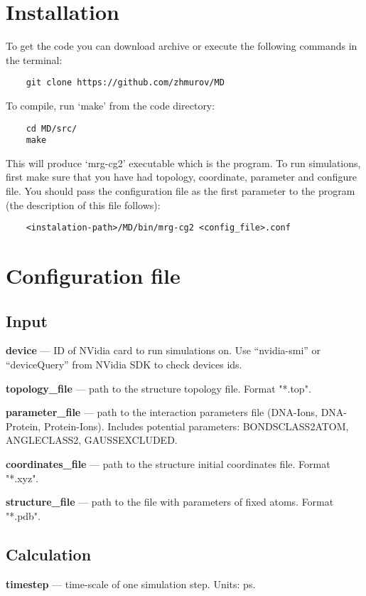 \documentclass[12pt,a4paper]{article}
\begin{document}
\section{Installation}
\label{sec:inst}
\noindent
To get the code you can download archive or execute the following commands in the terminal:
\begin{verbatim}
    git clone https://github.com/zhmurov/MD
\end{verbatim}
To compile, run `make' from the code directory:
\begin{verbatim}
    cd MD/src/
    make
\end{verbatim}
This will produce `mrg-cg2' executable which is the program. To run simulations, first make sure that you have had topology, coordinate, parameter and configure file. You should pass the configuration file as the first parameter to the program (the description of this file follows):
\begin{verbatim}
    <instalation-path>/MD/bin/mrg-cg2 <config_file>.conf
\end{verbatim}

\section{Configuration file}

\subsection{Input}

{\bf device} ---  ID of NVidia card to run simulations on. Use “nvidia-smi” or “deviceQuery” from NVidia SDK to check devices ids.

{\bf topology\_file} --- path to the structure topology file. Format "*.top".

{\bf parameter\_file} --- path to the interaction parameters file (DNA-Ions, DNA-Protein, Protein-Ions). Includes potential parameters: BONDSCLASS2ATOM, ANGLECLASS2, GAUSSEXCLUDED.

{\bf coordinates\_file} ---  path to the structure initial coordinates file. Format "*.xyz".

{\bf structure\_file} --- path to the file with parameters of fixed atoms. Format "*.pdb".

\subsection{Calculation}

{\bf timestep} --- time-scale of one simulation step. Units: ps.
\end{document}

